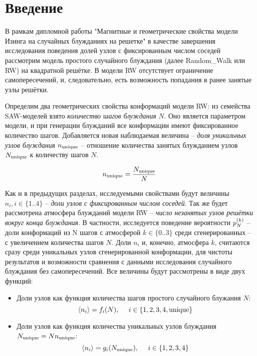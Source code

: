 \section{Введение}
\label{sec:neigh}

В рамкам дипломной работы "Магнитные и геометрические свойства модели Изинга на случайных блужданиях на решетке" 
в качестве завершения исследования поведения долей узлов с фиксированным числом соседей рассмотрим модель простого случайного блуждания (далее Random\_Walk или RW) на квадратной решётке. 
В модели RW отсутствует ограничение самопересечений, и, следовательно, есть возможность попадания в ранее занятые узлы решётки.

Определим два геометрических свойства конформаций модели RW: из семейства SAW-моделей взято \textit{количество шагов блуждания} $N$. 
Оно является параметром модели, и при генерации блужданий все конформации имеют фиксированное количество шагов.
Добавляется новая наблюдаемая величина -- \textit{доля уникальных узлов блуждания} $n_{\textup{unique}}$ -- отношение количества занятых блужданием узлов $N_{\textup{unique}}$ к количеству шагов $N$.

\begin{equation}
n_{\textup{unique}} = \frac{N_{\textup{unique}}}{N}
\label{eq:nun}
\end{equation}

Как и в предыдущих разделах, исследуемыми свойствами будут величины $n_i, i \in \{1..4\}$ -- \textit{доли узлов с фиксированным числом соседей}. 
Так же будет рассмотрена атмосфера блужданий модели RW -- \textit{число незанятых узлов решётки вокруг конца блуждания}. 
В частности, исследуется поведение вероятности $p^{(k)}_N$ -- доли конформаций из N шагов с атмосферой $k \in \{0..3\}$ среди сгенерированных -- с увеличением количества шагов $N$.
Доли $n_i$ и, конечно, атмосфера $k$, считаются сразу среди уникальных узлов сгенерированной конформации, для чистоты результатов и возможности сравнения с данными исследования случайного блуждания без самопересечений.
Все величины будут рассмотрены в виде двух функций:

\begin{itemize}
\item Доли узлов как функция количества шагов простого случайного блужания $N$: 
\begin{equation}
 \langle n_i \rangle = f_i(N),\ \ \ \ i \in \{1,2,3,4, \textup{unique}\}
\label{eq:f_i}
\end{equation}
\item Доли узлов как функция количества уникальных узлов блуждания $N_{\textup{unique}} = N n_{\textup{unique}}$:
\begin{equation}
 \langle n_i \rangle = g_i(N_{\textup{unique}}),\ \ \ \ i \in \{1,2,3,4\} 
\label{eq:g_i}
\end{equation}
\end{itemize}

